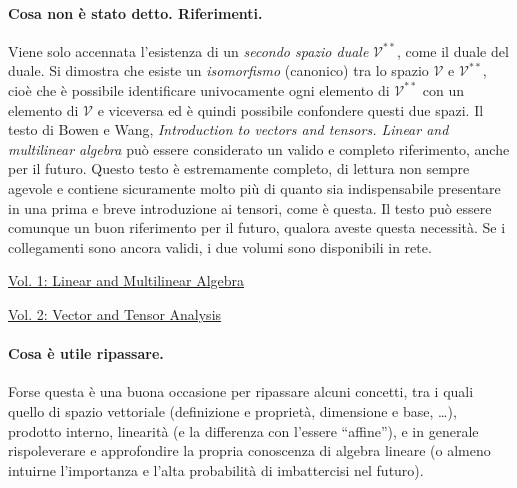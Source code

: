 \paragraph{Cosa non è stato detto. Riferimenti.} Viene solo accennata l'esistenza di un 
 \textit{secondo spazio duale} $\mathcal{V}^{**}$, come il duale del duale.
 Si dimostra che esiste un \textit{isomorfismo} (canonico) tra lo spazio $\mathcal{V}$ e $\mathcal{V}^{**}$,
 cioè che è possibile identificare univocamente ogni elemento di $\mathcal{V}^{**}$ con
 un elemento di $\mathcal{V}$ e viceversa ed è quindi possibile confondere questi due spazi.
 Il testo di Bowen e Wang, \textit{Introduction to vectors and tensors. Linear and multilinear
 algebra} può essere considerato un valido e completo riferimento, anche per il futuro.
 Questo testo è estremamente completo, di lettura non sempre agevole e contiene sicuramente molto più
 di quanto sia indispensabile presentare in una prima e breve introduzione ai tensori, come è questa.
 Il testo può essere comunque un buon riferimento per il futuro, qualora aveste questa necessità.
 Se i collegamenti sono ancora validi, i due volumi sono disponibili in rete. 
 
 \href{http://oaktrust.library.tamu.edu/bitstream/handle/1969.1/2502/IntroductionToVectorsAndTensorsVol1.pdf}
 {Vol. 1: Linear and Multilinear Algebra}
 
 \href{http://oaktrust.library.tamu.edu/bitstream/handle/1969.1/3609/IntroductionToVectorsAndTensorsVol2.pdf}
 {Vol. 2: Vector and Tensor Analysis}
 
 
 
 \paragraph{Cosa è utile ripassare.} Forse questa è una buona occasione per ripassare
 alcuni concetti, tra i quali quello di spazio vettoriale (definizione e proprietà, dimensione e base, \dots),
 prodotto interno, linearità (e la differenza con l'essere ``affine''), e in generale rispoleverare e approfondire
 la propria conoscenza di algebra lineare (o almeno intuirne l'importanza e l'alta probabilità di 
 imbattercisi nel futuro).
 
